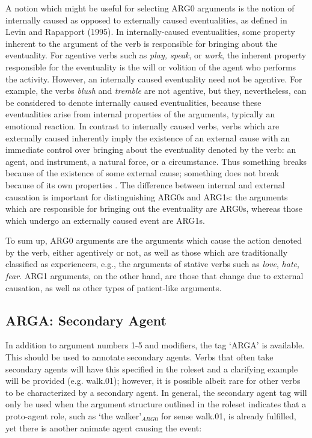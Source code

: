 \documentclass[11pt]{report}
\begin{document}
A notion which might be useful for selecting ARG0 arguments is the notion of internally caused as opposed to externally caused eventualities, as defined in Levin and Rapapport (1995).  In internally-caused eventualities, some property inherent to the argument of the verb is responsible for bringing about the eventuality.  For agentive verbs such as \textit{play, speak}, or \textit{work}, the inherent property responsible for the eventuality is the will or volition of the agent who performs the activity. However, an internally caused eventuality need not be agentive. For example, the verbs \textit{blush} and \textit{tremble} are not agentive, but they, nevertheless, can be considered to denote internally caused eventualities, because these eventualities arise from internal properties of the arguments, typically an emotional reaction.  In contrast to internally caused verbs, verbs which are externally caused inherently imply the existence of an external cause with an immediate control over bringing about the eventuality denoted by the verb: an agent, and instrument, a natural force, or a circumstance. Thus something breaks because of the existence of some external cause; something does not break because of its own properties \cite{levin-95}.  The difference between internal and external causation is important for distinguishing ARG0s and ARG1s: the arguments which are responsible for bringing out the eventuality are ARG0s, whereas those which undergo an externally caused event are ARG1s.  

To sum up, ARG0 arguments are the arguments which cause the action denoted by the verb, either agentively or not, as well as those which are traditionally classified as experiencers, e.g., the arguments of stative verbs such as \textit{love}, \textit{hate}, \textit{fear}.  ARG1 arguments, on the other hand, are those that change due to external causation, as well as other types of patient-like arguments.

\subsection{ARGA: Secondary Agent}
\label{ssec: ARGA}

In addition to argument numbers 1-5 and modifiers, the tag `ARGA' is available.  This should be used to annotate secondary agents.  Verbs that often take secondary agents will have this specified in the roleset and a clarifying example will be provided (e.g. walk.01); however, it is possible albeit rare for other verbs to be characterized by a secondary agent.  In general, the secondary agent tag will only be used when the argument structure outlined in the roleset indicates that a proto-agent role, such as `the walker'$_{ARG0}$ for sense walk.01,  is already fulfilled, yet there is another animate agent causing the event: 
\end{document}
